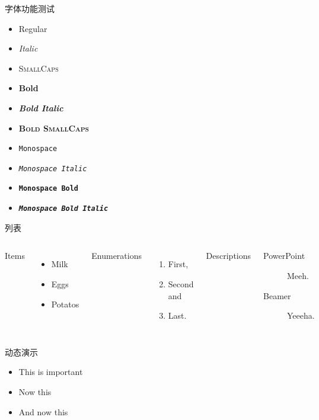 \documentclass[10pt,UTF8]{ctexbeamer}
\begin{document}
\begin{frame}{字体功能测试}
  \begin{itemize}
    \item Regular
    \item \textit{Italic}
    \item \textsc{SmallCaps}
    \item \textbf{Bold}
    \item \textbf{\textit{Bold Italic}}
    \item \textbf{\textsc{Bold SmallCaps}}
    \item \texttt{Monospace}
    \item \texttt{\textit{Monospace Italic}}
    \item \texttt{\textbf{Monospace Bold}}
    \item \texttt{\textbf{\textit{Monospace Bold Italic}}}
  \end{itemize}
\end{frame}

\begin{frame}{列表}
  \begin{columns}[T,onlytextwidth]
      Items
      \begin{itemize}
        \item Milk 
        \item Eggs 
        \item Potatos
      \end{itemize}

      Enumerations
      \begin{enumerate}
        \item First, 
        \item Second and 
        \item Last.
      \end{enumerate}

      Descriptions
      \begin{description}
        \item[PowerPoint] Meeh. 
        \item[Beamer] Yeeeha.
      \end{description}
  \end{columns}
\end{frame}

\begin{frame}{动态演示}
  \begin{itemize}[<+- | alert@+>]
    \item \alert<4>{This is important}
    \item Now this
    \item And now this
  \end{itemize}
\end{frame}
\end{document}
